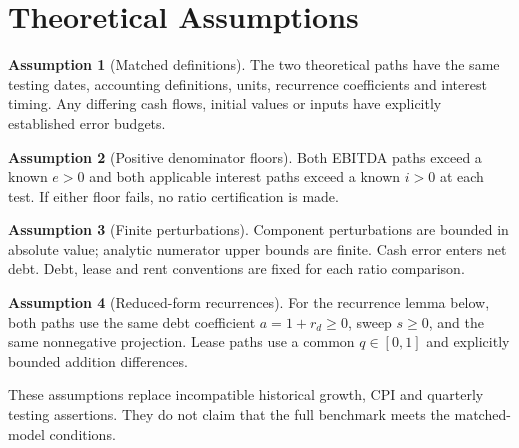 \documentclass[11pt,a4paper]{article}
\theoremstyle{plain}
\theoremstyle{definition}
\newtheorem{assumption}{Assumption}
\begin{document}
\section{Theoretical Assumptions}\label{app:assumptions}
\begin{assumption}[Matched definitions]\label{ass:growth}
The two theoretical paths have the same testing dates, accounting definitions,
units, recurrence coefficients and interest timing. Any differing cash flows,
initial values or inputs have explicitly established error budgets.
\end{assumption}
\begin{assumption}[Positive denominator floors]\label{ass:margins}
Both EBITDA paths exceed a known $e>0$ and both applicable interest paths exceed
a known $i>0$ at each test. If either floor fails, no ratio certification is made.
\end{assumption}
\begin{assumption}[Finite perturbations]\label{ass:sweep}
Component perturbations are bounded in absolute value; analytic numerator upper
bounds are finite. Cash error enters net debt. Debt, lease and rent conventions
are fixed for each ratio comparison.
\end{assumption}
\begin{assumption}[Reduced-form recurrences]\label{ass:rates}
For the recurrence lemma below, both paths use the same debt coefficient
$a=1+r_d\ge0$, sweep $s\ge0$, and the same nonnegative projection. Lease paths
use a common $q\in[0,1]$ and explicitly bounded addition differences.
\end{assumption}
These assumptions replace incompatible historical growth, CPI and quarterly
testing assertions. They do not claim that the full benchmark meets the
matched-model conditions.

\newpage
\end{document}
